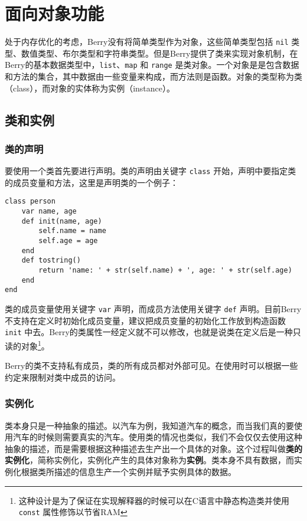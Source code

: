 \chapter{面向对象功能}

处于内存优化的考虑，Berry没有将简单类型作为对象，这些简单类型包括 \texttt{nil} 类型、数值类型、布尔类型和字符串类型。但是Berry提供了类来实现对象机制，在Berry的基本数据类型中，\texttt{list}、\texttt{map} 和 \texttt{range} 是类对象。一个对象是是包含数据和方法的集合，其中数据由一些变量来构成，而方法则是函数。对象的类型称为类（class），而对象的实体称为实例（instance）。

\section{类和实例}

\subsection{类的声明}

要使用一个类首先要进行声明。类的声明由关键字 \texttt{class} 开始，声明中要指定类的成员变量和方法，这里是声明类的一个例子：
\begin{lstlisting}[language=berry, numbers=none]
class person
    var name, age
    def init(name, age)
        self.name = name
        self.age = age
    end
    def tostring()
        return 'name: ' + str(self.name) + ', age: ' + str(self.age)
    end
end
\end{lstlisting}

类的成员变量使用关键字 \texttt{var} 声明，而成员方法使用关键字 \texttt{def} 声明。目前Berry不支持在定义时初始化成员变量，建议把成员变量的初始化工作放到构造函数 \texttt{init} 中去。Berry的类属性一经定义就不可以修改，也就是说类在定义后是一种只读的对象\footnote{这种设计是为了保证在实现解释器的时候可以在C语言中静态构造类并使用 \texttt{const} 属性修饰以节省RAM}。

Berry的类不支持私有成员，类的所有成员都对外部可见。在使用时可以根据一些约定来限制对类中成员的访问。

\subsection{实例化}

类本身只是一种抽象的描述。以汽车为例，我知道汽车的概念，而当我们真的要使用汽车的时候则需要真实的汽车。使用类的情况也类似，我们不会仅仅去使用这种抽象的描述，而是需要根据这种描述去生产出一个具体的对象。这个过程叫做\textbf{类的实例化}，简称实例化，实例化产生的具体对象称为\textbf{实例}。类本身不具有数据，而实例化根据类所描述的信息生产一个实例并赋予实例具体的数据。

